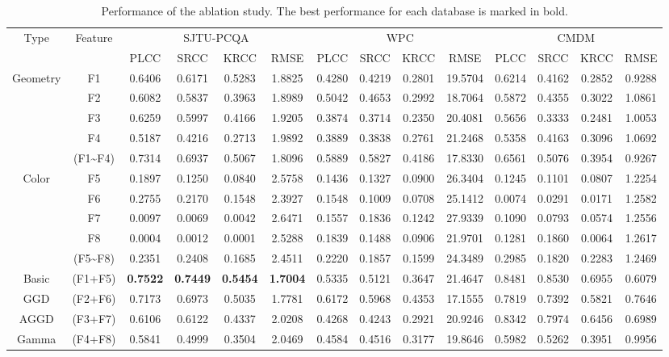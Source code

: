 \documentclass[lettersize,journal]{IEEEtran}
\begin{document}
\begin{table*}[t]
\renewcommand\arraystretch{1.5}
\renewcommand\tabcolsep{5.5pt}
\setlength{\abovecaptionskip}{-5pt}
  \caption{ Performance of the ablation study. The best performance for each database is marked in bold.}
  
  \label{tab:ablation}
  \begin{center}
  \begin{tabular}{c|c|cccc|cccc|cccc}
    \toprule
    \multirow{2}{*}{Type}  & \multirow{2}{*}{Feature}  & \multicolumn{4}{c|}{SJTU-PCQA} & \multicolumn{4}{c|}{WPC} & \multicolumn{4}{c}{CMDM} \\
    \cline{3-14}
    &  &PLCC & SRCC & KRCC & RMSE & PLCC & SRCC & KRCC & RMSE & PLCC & SRCC & KRCC & RMSE \\
    \hline
    \multirow{5}{*}{Geometry} & F1 & 0.6406 & 0.6171 & 0.5283 & 1.8825 & 0.4280 & 0.4219 & 0.2801 & 19.5704 & 0.6214  &0.4162  &0.2852 & 0.9288 \\
    &F2 & 0.6082 & 0.5837 & 0.3963 & 1.8989 & 0.5042 & 0.4653 & 0.2992 & 18.7064 & 0.5872  &0.4355  &0.3022 & 1.0861 \\
    &F3 & 0.6259 & 0.5997 & 0.4166 & 1.9205 & 0.3874 & 0.3714 & 0.2350 & 20.4081 & 0.5656  &0.3333  &0.2481 & 1.0053 \\
    &F4 & 0.5187 & 0.4216 & 0.2713 & 1.9892 & 0.3889 & 0.3838 & 0.2761 & 21.2468 & 0.5358  &0.4163  &0.3096 & 1.0692 \\ 
    & (F1\~{}F4)  & 0.7314  & 0.6937 & 0.5067 & 1.8096 & 0.5889  & 0.5827 & 0.4186 & 17.8330 & 0.6561 & 0.5076 & 0.3954 & 0.9267 \\\hline
    \multirow{5}{*}{Color}
    &F5 & 0.1897 & 0.1250 & 0.0840 & 2.5758 & 0.1436 & 0.1327 & 0.0900 & 26.3404 & 0.1245  &0.1101  &0.0807 & 1.2254 \\
    &F6 & 0.2755 & 0.2170 & 0.1548 & 2.3927 & 0.1548 & 0.1009 & 0.0708 & 25.1412 & 0.0074  & 0.0291  & 0.0171 & 1.2582 \\
    &F7  & 0.0097 & 0.0069 & 0.0042 & 2.6471 & 0.1557 & 0.1836 & 0.1242 & 27.9339 & 0.1090  &0.0793  &0.0574 & 1.2556 \\
    &F8 & 0.0004 & 0.0012 & 0.0001 & 2.5288 & 0.1839 & 0.1488 & 0.0906 & 21.9701 & 0.1281  &0.1860  &0.0064 & 1.2617 \\
    &(F5\~{}F8)  & 0.2351 & 0.2408 & 0.1685 & 2.4511 & 0.2220 & 0.1857 & 0.1599 & 24.3489 & 0.2985 & 0.1820  & 0.2283 & 1.2469\\ \hline
    Basic & (F1+F5)  & \textbf{0.7522} & \textbf{0.7449} & \textbf{0.5454}  & \textbf{1.7004} & 0.5335 & 0.5121 & 0.3647  & 21.4647 & {0.8481} & {0.8530}  & {0.6955} & {0.6079}\\
GGD & (F2+F6)  & 0.7173  & 0.6973 & 0.5035 & 1.7781 & 0.6172  & 0.5968 & 0.4353 & 17.1555 & 0.7819  & 0.7392 & 0.5821 & 0.7646\\
AGGD & (F3+F7)  & 0.6106 & 0.6122 & 0.4337 & 2.0208 & 0.4268 & 0.4243 & 0.2921 & 20.9246 & 0.8342 & 0.7974 & 0.6456 & 0.6989\\
Gamma & (F4+F8)  & 0.5841 & 0.4999 & 0.3504 & 2.0469 & 0.4584 & 0.4516 & 0.3177 & 19.8646 & 0.5982 & 0.5262 & 0.3951 & 0.9956\\ \hline





\end{tabular}
\end{center}
\end{table*}
\end{document}
